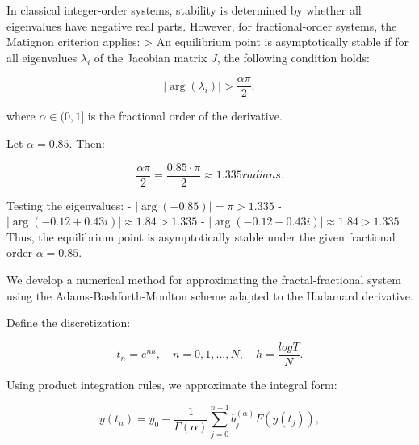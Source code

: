 \documentclass[10pt]{NSP1}
\begin{document}
\par\medskip{}\smallskip

In classical integer-order systems, stability is determined by whether all eigenvalues have negative real parts. However, for fractional-order systems, the Matignon criterion applies: \textgreater{} An equilibrium point is asymptotically stable if for all eigenvalues $\lambda_{i}$ of the Jacobian matrix $J$, the following condition holds:

\begin{equation}
\left| \arg\left( \lambda_{i} \right) \right| > \frac{\alpha\pi}{2},

\end{equation}

where $\alpha \in (0,1\rbrack$ is the fractional order of the derivative.

Let $\alpha = 0.85$. Then:

\begin{equation}
\frac{\alpha\pi}{2} = \frac{0.85 \cdot \pi}{2} \approx 1.335radians.

\end{equation}

Testing the eigenvalues: - $\left| \arg( - 0.85) \right| = \pi > 1.335$ - $\left| \arg( - 0.12 + 0.43i) \right| \approx 1.84 > 1.335$ - $\left| \arg( - 0.12 - 0.43i) \right| \approx 1.84 > 1.335$ Thus, the equilibrium point is asymptotically stable under the given fractional order $\alpha = 0.85$.

\par\medskip{}\smallskip

We develop a numerical method for approximating the fractal-fractional system using the Adams-Bashforth-Moulton scheme adapted to the Hadamard derivative.

Define the discretization:

\begin{equation}
t_{n} = e^{nh},\quad n = 0,1,...,N,\quad h = \frac{logT}{N}.

\end{equation}

Using product integration rules, we approximate the integral form:

\begin{equation}
y\left( t_{n} \right) = y_{0} + \frac{1}{\Gamma(\alpha)}\sum_{j = 0}^{n - 1}{}b_{j}^{(\alpha)}F\left( y\left( t_{j} \right) \right),

\end{equation}
\end{document}
